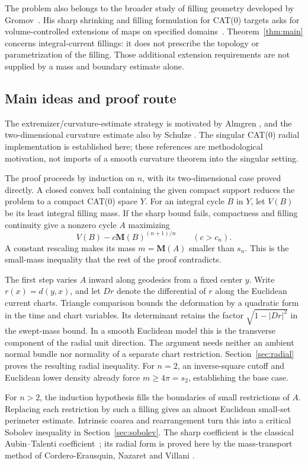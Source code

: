 \documentclass[11pt]{article}
\numberwithin{equation}{section}
\theoremstyle{definition}
\theoremstyle{remark}
\newcommand{\M}{\mathbf M}
\begin{document}
The problem also belongs to the broader study of filling geometry
developed by Gromov~\cite{Gromov1983}. His sharp shrinking and filling
formulation for CAT(0) targets asks for volume-controlled extensions of
maps on specified domains~\cite[Section~2.3]{Gromov2014}.
Theorem~\ref{thm:main} concerns integral-current fillings: it does not
prescribe the topology or parametrization of the filling. Those
additional extension requirements are not supplied by a mass and
boundary estimate alone.

\subsection{Main ideas and proof route}

The extremizer/curvature-estimate strategy is motivated by Almgren
\cite[Section~0, p.~454]{Almgren1986}, and the two-dimensional
curvature estimate also by Schulze \cite[Theorem~1.4]{Schulze2020}.
The singular CAT(0) radial implementation is established here; these
references are methodological motivation, not imports of a smooth
curvature theorem into the singular setting.

The proof proceeds by induction on $n$, with its two-dimensional case
proved directly. A closed convex ball containing the given compact
support reduces the problem to a compact CAT(0) space $Y$. For an
integral cycle $B$ in $Y$, let $V(B)$ be its least integral filling mass.
If the sharp bound fails, compactness and filling continuity give a
nonzero cycle $A$ maximizing
\[
 V(B)-c\M(B)^{(n+1)/n}\qquad(c>c_n).
\]
A constant rescaling makes its mass $m=\M(A)$ smaller than $s_n$.
This is the small-mass inequality that the rest of the proof contradicts.

The first step varies $A$ inward along geodesics from a fixed center
$y$. Write $r(x)=d(y,x)$, and let $Dr$ denote the differential of $r$
along the Euclidean current charts. Triangle comparison bounds the
deformation by a quadratic form in the time and chart variables.
Its determinant retains the factor $\sqrt{1-|Dr|^2}$ in the swept-mass
bound. In a smooth Euclidean model this is the transverse component of
the radial unit direction. The argument needs neither an ambient
normal bundle nor normality of a separate chart restriction.
Section~\ref{sec:radial} proves the resulting radial inequality.
For $n=2$, an inverse-square cutoff and Euclidean lower density
already force $m\ge4\pi=s_2$, establishing the base case.

For $n>2$, the induction hypothesis fills the boundaries of small
restrictions of $A$. Replacing each restriction by such a filling
gives an almost Euclidean small-set perimeter estimate. Intrinsic
coarea and rearrangement turn this into a critical Sobolev inequality
in Section~\ref{sec:sobolev}. The sharp coefficient is the classical
Aubin--Talenti coefficient~\cite{Aubin1976,Talenti1976}; its radial
form is proved here by the mass-transport method of
Cordero-Erausquin, Nazaret and Villani
\cite[Section~2]{CorderoNazaretVillani2004}.
\end{document}
